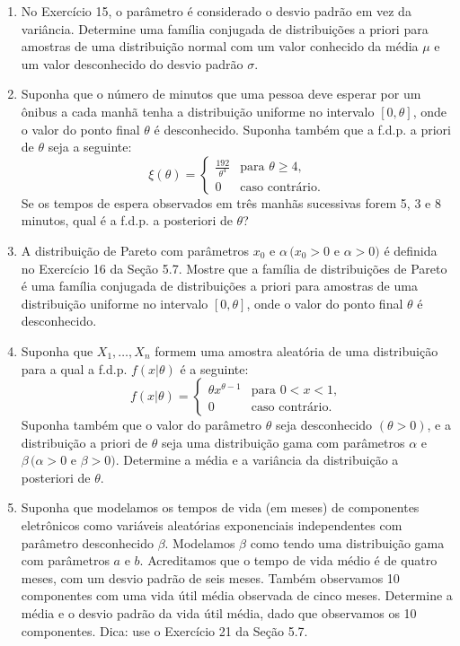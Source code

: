 \begin{enumerate}
    \item No Exercício 15, o parâmetro é considerado o desvio padrão em vez da variância. Determine uma família conjugada de distribuições a priori para amostras de uma distribuição normal com um valor conhecido da média $\mu$ e um valor desconhecido do desvio padrão $\sigma$.
    
    \item Suponha que o número de minutos que uma pessoa deve esperar por um ônibus a cada manhã tenha a distribuição uniforme no intervalo $[0, \theta]$, onde o valor do ponto final $\theta$ é desconhecido. Suponha também que a f.d.p. a priori de $\theta$ seja a seguinte:
    $$ \xi(\theta) = 
    \begin{cases}
        \frac{192}{\theta^4} & \text{para } \theta \ge 4, \\
        0 & \text{caso contrário.}
    \end{cases}
    $$
    Se os tempos de espera observados em três manhãs sucessivas forem 5, 3 e 8 minutos, qual é a f.d.p. a posteriori de $\theta$?
    
    \item A distribuição de Pareto com parâmetros $x_0$ e $\alpha \, (x_0>0$ e $\alpha>0)$ é definida no Exercício 16 da Seção 5.7. Mostre que a família de distribuições de Pareto é uma família conjugada de distribuições a priori para amostras de uma distribuição uniforme no intervalo $[0, \theta]$, onde o valor do ponto final $\theta$ é desconhecido.
    
    \item Suponha que $X_1, \dots, X_n$ formem uma amostra aleatória de uma distribuição para a qual a f.d.p. $f(x|\theta)$ é a seguinte:
    $$ f(x|\theta) = 
    \begin{cases}
        \theta x^{\theta-1} & \text{para } 0 < x < 1, \\
        0 & \text{caso contrário.}
    \end{cases}
    $$
    Suponha também que o valor do parâmetro $\theta$ seja desconhecido $(\theta>0)$, e a distribuição a priori de $\theta$ seja uma distribuição gama com parâmetros $\alpha$ e $\beta \, (\alpha>0$ e $\beta>0)$. Determine a média e a variância da distribuição a posteriori de $\theta$.
    
    \item Suponha que modelamos os tempos de vida (em meses) de componentes eletrônicos como variáveis aleatórias exponenciais independentes com parâmetro desconhecido $\beta$. Modelamos $\beta$ como tendo uma distribuição gama com parâmetros $a$ e $b$. Acreditamos que o tempo de vida médio é de quatro meses, com um desvio padrão de seis meses. Também observamos 10 componentes com uma vida útil média observada de cinco meses. Determine a média e o desvio padrão da vida útil média, dado que observamos os 10 componentes. Dica: use o Exercício 21 da Seção 5.7.
    

\end{enumerate}
